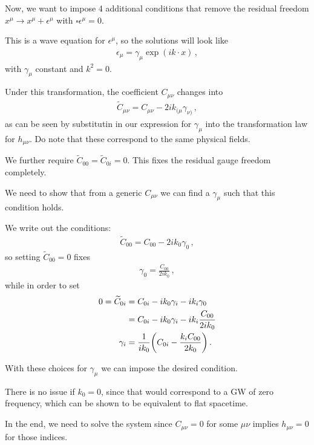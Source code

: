 \documentclass[main.tex]{subfiles}
\begin{document}
Now, we want to impose 4 additional conditions that remove the residual freedom \(x^{\mu } \rightarrow x^{\mu } + \epsilon^{\mu }\) with \(\square \epsilon^{\mu } = 0\). 

This is a wave equation for \(\epsilon^{\mu }\), so the solutions will look like 
%
\begin{align}
\epsilon_{\mu } = \gamma_{\mu } \exp( i k \cdot
 x ) 
\,,
\end{align}
%
with \(\gamma_{\mu }\) constant and \(k^2=0\). 

Under this transformation, the coefficient \(C_{\mu \nu }\) changes into 
%
\begin{align}
\widetilde{C}_{\mu \nu } = C_{\mu \nu } - 2i k_{(\mu } \gamma_{\nu )} 
\,,
\end{align}
%
as can be seen by substitutin in our expression for \(\gamma_{\mu } \) into the transformation law for \(h_{\mu \nu }\). 
Do note that these correspond to the same physical fields. 

We further require \(\widetilde{C}_{00 } = \widetilde{C}_{0i}= 0 \). This fixes the residual gauge freedom completely. 

We need to show that from a generic \(C_{\mu \nu }\) we can find a \(\gamma_{\mu }\) such that this condition holds. 

We write out the conditions: 
%
\begin{align}
\widetilde{C}_{00} = C_{00} - 2 i k_0 \gamma_0 
\,,
\end{align}
%
so setting \(\widetilde{C}_{00} =0 \) fixes 
%
\begin{align}
\gamma_0 = \frac{C_{00} }{2ik_0 }
\,,
\end{align}
%
while  in order to set 
%
\begin{align}
0=\widetilde{C}_{0i} &= C_{0i} - ik_0 \gamma_{i} - i k_{i} \gamma_0  \\
&= C_{0i} - i k_0 \gamma_{i} - i k_{i} \frac{C_{00} }{2 i k_0 }  \\
\gamma_{i } &= \frac{1}{i k_0 } \qty(C_{0i} - \frac{k_{i} C_{00} }{2 k_0 })
\,.
\end{align}

With these choices for \(\gamma_{\mu }\) we can impose the desired condition.

There is no issue if \(k_0 = 0\), since that would correspond to a GW of zero frequency, which can be shown to be equivalent to flat spacetime. 

In the end, we need to solve the system 
%
%
since \(C_{\mu \nu }= 0\) for some \(\mu \nu \) implies \(h_{\mu \nu }=0\) for those indices.
\end{document}
